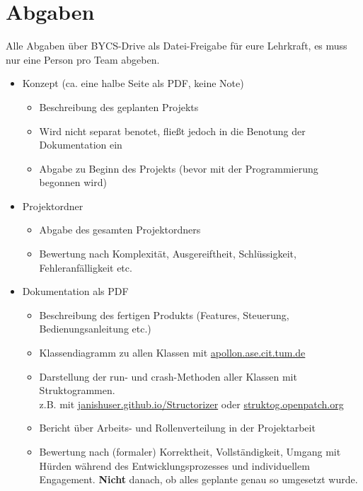 {\section{Abgaben}
Alle Abgaben über BYCS-Drive als Datei-Freigabe für eure Lehrkraft, es muss nur eine Person pro Team abgeben.
\begin{itemize}
    \item Konzept (ca. eine halbe Seite als PDF, keine Note)\begin{itemize}
        \item Beschreibung des geplanten Projekts
        \item Wird nicht separat benotet, fließt jedoch in die Benotung der Dokumentation ein
        \item Abgabe zu Beginn des Projekts (bevor mit der Programmierung begonnen wird)
    \end{itemize}
    \item Projektordner \begin{itemize}
        \item Abgabe des gesamten Projektordners
        \item Bewertung nach Komplexität, Ausgereiftheit, Schlüssigkeit, Fehleranfälligkeit etc.
    \end{itemize}
    \item Dokumentation als PDF \begin{itemize}
        \item Beschreibung des fertigen Produkts (Features, Steuerung, Bedienungsanleitung etc.)
        \item Klassendiagramm zu allen Klassen mit \href{https://apollon.ase.cit.tum.de/}{apollon.ase.cit.tum.de}
        \item Darstellung der run- und crash-Methoden aller Klassen mit Struktogrammen.\\
        z.B. mit \href{https://janishuser.github.io/Structorizer/struct.html}{janishuser.github.io/Structorizer} oder \href{https://struktog.openpatch.org}{struktog.openpatch.org}
        \item Bericht über Arbeits- und Rollenverteilung in der Projektarbeit
        \item Bewertung nach (formaler) Korrektheit, Vollständigkeit, Umgang mit Hürden während des Entwicklungsprozesses und individuellem Engagement. \textbf{Nicht} danach, ob alles geplante genau so umgesetzt wurde.
    \end{itemize}
\end{itemize}
}